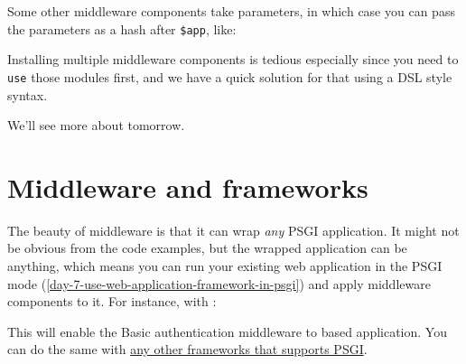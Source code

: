 Some other middleware components take parameters, in which case you can
pass the parameters as a hash after \lstinline!$app!, like:


Installing multiple middleware components is tedious especially since
you need to \lstinline!use! those modules first, and we have a quick
solution for that using a DSL style syntax.


We'll see more about  tomorrow.

\section{Middleware and frameworks}\label{middleware-and-frameworks}

The beauty of middleware is that it can wrap \emph{any} PSGI
application. It might not be obvious from the code examples, but the
wrapped application can be anything, which means you can run
your existing web application in the PSGI mode 
(\autoref{day-7-use-web-application-framework-in-psgi}) and apply middleware
components to it. For instance, with :


This will enable the Basic authentication middleware to 
based application. You can do the same with
\href{http://plackperl.org/\#frameworks}{any other frameworks that
supports PSGI}.

